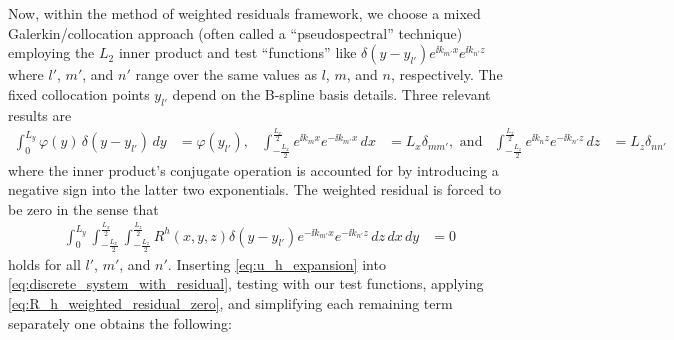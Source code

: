 Now, within the method of weighted residuals framework, we choose a mixed
Galerkin/collocation approach (often called a ``pseudospectral'' technique)
employing the $L_{2}$ inner product and test ``functions'' like
$\delta(y-y_{l'}) e^{\ii k_{m'} x}e^{\ii k_{n'} z}$ where $l'$, $m'$, and $n'$
range over the same values as $l$, $m$, and $n$, respectively.  The fixed
collocation points $y_{l'}$ depend on the B-spline basis details.  Three
relevant results are
\begin{align}
   \int_0^{L_y} \varphi(y) \, \delta(y-y_{l'}) \,d\!y
&= \varphi(y_{l'}),
&
   \int_{-\frac{L_x}{2}}^{\frac{L_x}{2}} e^{\ii k_m x} e^{-\ii k_{m'} x} \,d\!x
&= L_x \delta_{m m'}, \text{ and}
&
   \int_{-\frac{L_z}{2}}^{\frac{L_z}{2}} e^{\ii k_n z} e^{-\ii k_{n'} z} \,d\!z
&= L_z \delta_{n n'}
\end{align}
where the inner product's conjugate operation is accounted for by introducing a
negative sign into the latter two exponentials.  The weighted residual is
forced to be zero in the sense that
\begin{align}
  \int_0^{L_y}
  \int_{-\frac{L_x}{2}}^{\frac{L_x}{2}}
  \int_{-\frac{L_z}{2}}^{\frac{L_z}{2}}
  R^h\!\left(x,y,z\right) \delta(y-y_{l'}) e^{-\ii k_{m'} x}e^{-\ii k_{n'} z}
  \,d\!z \,d\!x \,d\!y
  &=
  0
  \label{eq:R_h_weighted_residual_zero}
\end{align}
holds for all $l'$, $m'$, and $n'$.  Inserting \eqref{eq:u_h_expansion} into
\eqref{eq:discrete_system_with_residual}, testing with our test functions,
applying \eqref{eq:R_h_weighted_residual_zero}, and simplifying each remaining
term separately one obtains the following:
